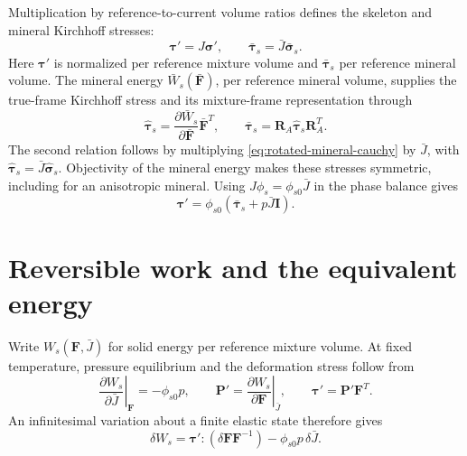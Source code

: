 \documentclass[11pt]{article}
\newcommand{\pder}[2]{\frac{\partial #1}{\partial #2}}
\begin{document}
Multiplication by reference-to-current volume ratios defines the skeleton
and mineral Kirchhoff stresses:
\begin{equation}
 \mathbf\tau'=J\mathbf\sigma',\qquad
 \bar{\mathbf\tau}_s=\bar J\bar{\mathbf\sigma}_s.
 \label{eq:kirchhoff-volume-conventions}
\end{equation}
Here \(\mathbf\tau'\) is normalized per reference mixture volume and
\(\bar{\mathbf\tau}_s\) per reference mineral volume.
The mineral energy \(\bar W_s(\bar{\mathbf F})\), per reference mineral
volume, supplies the true-frame Kirchhoff stress and its mixture-frame
representation through
\begin{equation}
 \widehat{\mathbf\tau}_s
 =\pder{\bar W_s}{\bar{\mathbf F}}\bar{\mathbf F}^T,\qquad
 \bar{\mathbf\tau}_s
 =\mathbf R_A\widehat{\mathbf\tau}_s\mathbf R_A^T.
\label{eq:rotated-mineral-kirchhoff}
\end{equation}
The second relation follows by multiplying
\eqref{eq:rotated-mineral-cauchy} by \(\bar J\), with
\(\widehat{\mathbf\tau}_s=\bar J\widehat{\mathbf\sigma}_s\).
Objectivity of the mineral energy makes these stresses symmetric, including
for an anisotropic mineral. Using \(J\phi_s=\phi_{s0}\bar J\) in the
phase balance gives
\begin{equation}
 \mathbf\tau'
 =\phi_{s0}(\bar{\mathbf\tau}_s+p\bar J\mathbf I).
 \label{eq:constitutive-kirchhoff-phase-stress}
\end{equation}

\section{Reversible work and the equivalent energy}
\label{sec:work-equivalence}

Write \(W_s(\mathbf F,\bar J)\) for solid energy per reference mixture
volume. At fixed temperature, pressure equilibrium and the deformation
stress follow from \citep{fosterxu2025}
\begin{equation}
 \left.\pder{W_s}{\bar J}\right|_{\mathbf F}=-\phi_{s0}p,
 \qquad
 \mathbf P'=\left.\pder{W_s}{\mathbf F}\right|_{\bar J},
 \qquad \mathbf\tau'=\mathbf P'\mathbf F^T.
 \label{eq:pressure-conjugacy}
\end{equation}
An infinitesimal variation about a finite elastic state therefore gives
\begin{equation}
 \delta W_s=\mathbf\tau':(\delta\mathbf F\mathbf F^{-1})
                 -\phi_{s0}p\,\delta\bar J.
 \label{eq:coupled-energy-work}
\end{equation}
\end{document}
